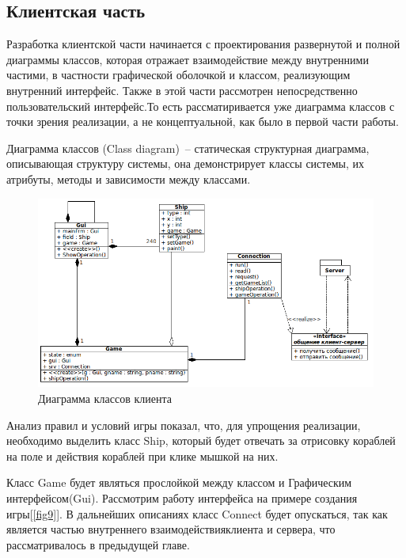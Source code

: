 ﻿\subsection{Клиентская часть}
Разработка клиентской части начинается с проектирования развернутой и полной диаграммы классов, которая отражает взаимодействие между внутренними частими, в частности графической оболочкой и классом, реализующим внутренний интерфейс. 
Также в этой части рассмотрен непосредственно пользовательский интерфейс.То есть рассматиривается уже диаграмма классов с точки зрения реализации, а не концептуальной, как было в первой части работы.

Диаграмма классов (Class diagram)~-- статическая структурная диаграмма, описывающая структуру системы, она демонстрирует классы системы, их атрибуты, методы и зависимости между классами.

\begin{figure}[ht]
\centering
\includegraphics[width=18cm]{images/class_client.png}
\caption{Диаграмма классов клиента}
\label{fig8}
\end{figure}


Анализ правил и условий игры показал, что, для упрощения реализации, необходимо выделить класс Ship, который будет отвечать за отрисовку кораблей на поле и действия кораблей при клике мышкой на них.

Класс Game будет являться прослойкой между классом и Графическим интерфейсом(Gui). Рассмотрим работу интерфейса на примере создания игры[\ref{fig9}]. В дальнейших описаниях класс Connect будет опускаться, так как является частью внутреннего взаимодействияклиента и сервера, что рассматривалось в предыдущей главе.

